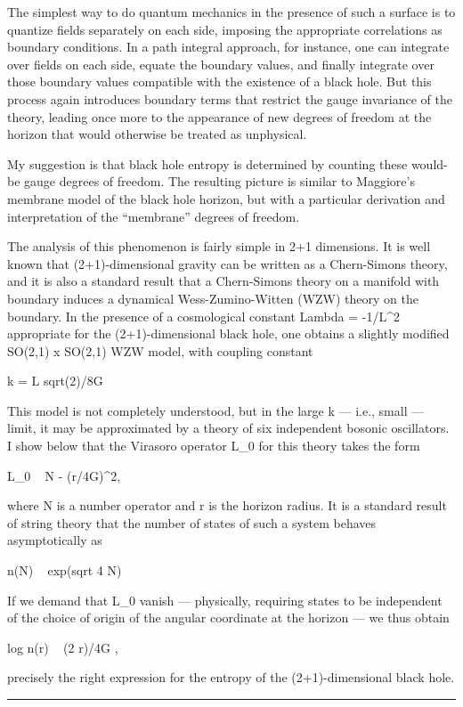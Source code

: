 The simplest way to do quantum mechanics in the presence of such a
surface is to quantize fields separately on each side, imposing the
appropriate correlations as boundary conditions.  In a path integral
approach, for instance, one can integrate over fields on each side,
equate the boundary values, and finally integrate over those boundary
values compatible with the existence of a black hole.  But this process
again introduces boundary terms that restrict the gauge invariance of
the theory, leading once more to the appearance of new degrees of
freedom at the horizon that would otherwise be treated as unphysical.

My suggestion is that black hole entropy is determined by counting these
would-be gauge degrees of freedom.  The resulting picture is similar to
Maggiore's membrane model of the black hole horizon, but with a
particular derivation and interpretation of the ``membrane'' degrees of
freedom.

The analysis of this phenomenon is fairly simple in 2+1 dimensions.  It
is well known that (2+1)-dimensional gravity can be written as a
Chern-Simons theory, and it is also a standard result that a
Chern-Simons theory on a manifold with boundary induces a dynamical
Wess-Zumino-Witten (WZW) theory on the boundary.  In the presence of a
cosmological constant Lambda = -1/L^2 appropriate for the
(2+1)-dimensional black hole, one obtains a slightly modified SO(2,1) x
SO(2,1) WZW model, with coupling constant

k = L sqrt(2)/8G 

This model is not completely understood, but in the large k --- i.e.,
small \Lambda  --- limit, it may be approximated by a theory of six
independent bosonic oscillators.  I show below that the Virasoro
operator L_0 for this theory takes the form

L_0 ~ N - (r/4G)^2,

where N is a number operator and r is the horizon radius.  It is a
standard result of string theory that the number of states of such a
system behaves asymptotically as

n(N) ~ exp(\pi  sqrt 4 N)

If we demand that L_0 vanish --- physically, requiring states to
be independent of the choice of origin of the angular coordinate at the
horizon --- we thus obtain

log n(r) ~ (2 \pi  r)/4G ,

precisely the right expression for the entropy of the (2+1)-dimensional
black hole.  
\par\noindent\rule{\textwidth}{0.4pt}


